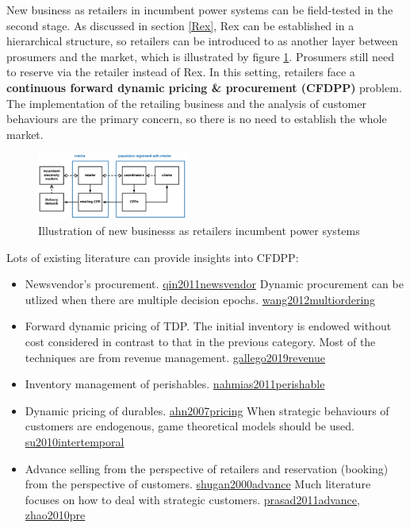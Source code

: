 \documentclass[letterpaper,8pt,twocolumn,twoside,]{pinp}
\providecommand{\tightlist}{%
  \setlength{\itemsep}{0pt}\setlength{\parskip}{0pt}}
\begin{document}
\label{EXP}

New business as retailers in incumbent power systems can be field-tested
in the second stage. As discussed in section \ref{Rex}, Rex can be
established in a hierarchical structure, so retailers can be introduced
to as another layer between prosumers and the market, which is
illustrated by figure \ref{3}. Prosumers still need to reserve via the
retailer instead of Rex. In this setting, retailers face a
\textbf{continuous forward dynamic pricing \& procurement (CFDPP)}
problem. The implementation of the retailing business and the analysis
of customer behaviours are the primary concern, so there is no need to
establish the whole market.

\begin{figure}
  \begin{center}
    \includegraphics[width=0.44\textwidth]{../../../images/4-11.png}
  \end{center}
  \caption{Illustration of new businesss as retailers incumbent power systems}
  \label{3}
\end{figure}

Lots of existing literature can provide insights into CFDPP:

\begin{itemize}
\tightlist
\item
  Newsvendor's procurement.
  \protect\hyperlink{reference}{qin2011newsvendor} Dynamic procurement
  can be utlized when there are multiple decision epochs.
  \protect\hyperlink{reference}{wang2012multiordering}
\item
  Forward dynamic pricing of TDP. The initial inventory is endowed
  without cost considered in contrast to that in the previous category.
  Most of the techniques are from revenue management.
  \protect\hyperlink{reference}{gallego2019revenue}
\item
  Inventory management of perishables.
  \protect\hyperlink{reference}{nahmias2011perishable}
\item
  Dynamic pricing of durables.
  \protect\hyperlink{reference}{ahn2007pricing} When strategic
  behaviours of customers are endogenous, game theoretical models should
  be used. \protect\hyperlink{reference}{su2010intertemporal}
\item
  Advance selling from the perspective of retailers and reservation
  (booking) from the perspective of customers.
  \protect\hyperlink{reference}{shugan2000advance} Much literature
  focuses on how to deal with strategic customers.
  \protect\hyperlink{reference}{prasad2011advance},
  \protect\hyperlink{reference}{zhao2010pre}
\end{itemize}
\end{document}

